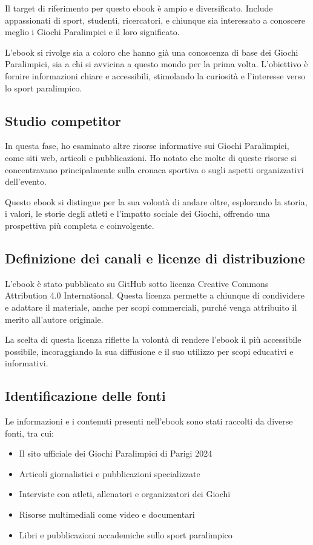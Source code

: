 \documentclass[a4paper,12pt]{report}
\begin{document}
Il target di riferimento per questo ebook è ampio e diversificato. Include appassionati di sport, studenti, ricercatori, e chiunque sia interessato a conoscere meglio i Giochi Paralimpici e il loro significato.

L'ebook si rivolge sia a coloro che hanno già una conoscenza di base dei Giochi Paralimpici, sia a chi si avvicina a questo mondo per la prima volta. L'obiettivo è fornire informazioni chiare e accessibili, stimolando la curiosità e l'interesse verso lo sport paralimpico.

\subsection{Studio competitor}

In questa fase, ho esaminato altre risorse informative sui Giochi Paralimpici, come siti web, articoli e pubblicazioni. Ho notato che molte di queste risorse si concentravano principalmente sulla cronaca sportiva o sugli aspetti organizzativi dell'evento. 

Questo ebook si distingue per la sua volontà di andare oltre, esplorando la storia, i valori, le storie degli atleti e l'impatto sociale dei Giochi, offrendo una prospettiva più completa e coinvolgente.

\subsection{Definizione dei canali e licenze di distribuzione}

L'ebook è stato pubblicato su GitHub sotto licenza Creative Commons Attribution 4.0 International. Questa licenza permette a chiunque di condividere e adattare il materiale, anche per scopi commerciali, purché venga attribuito il merito all'autore originale.

La scelta di questa licenza riflette la volontà di rendere l'ebook il più accessibile possibile, incoraggiando la sua diffusione e il suo utilizzo per scopi educativi e informativi.

\subsection{Identificazione delle fonti}

Le informazioni e i contenuti presenti nell'ebook sono stati raccolti da diverse fonti, tra cui:

\begin{itemize}
\item Il sito ufficiale dei Giochi Paralimpici di Parigi 2024
\item Articoli giornalistici e pubblicazioni specializzate
\item Interviste con atleti, allenatori e organizzatori dei Giochi
\item Risorse multimediali come video e documentari
\item Libri e pubblicazioni accademiche sullo sport paralimpico
\end{itemize}
\end{document}
